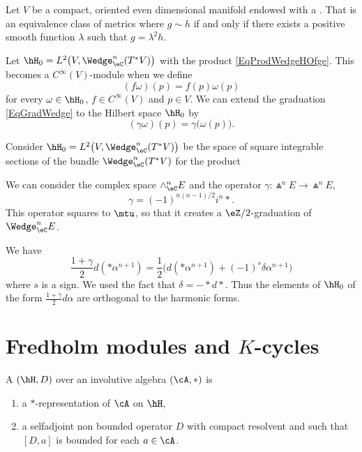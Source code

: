 Let $V$ be a compact, oriented even dimensional manifold endowed with a . That is an equivalence class of metrics where $g\sim h$ if and only if there exists a positive smooth function $\lambda$ such that $g=\lambda^2 h$.

Let $\hH_0=L^2\big( V,\Wedge^n_{\eC}(T^*V) \big)$ with the product \eqref{EqProdWedgeHOfge}. This becomes a $ C^{\infty}(V)$-module when we define
\begin{equation}
	(f\omega)(p)=f(p)\omega(p)
\end{equation}
for every $\omega\in\hH_0$, $f\in C^{\infty}(V)$ and $p\in V$. We can extend the graduation \eqref{EqGradWedge} to the Hilbert space $\hH_0$ by
\begin{equation}
	(\gamma\omega)(p)=\gamma\big( \omega(p) \big).
\end{equation}


Consider $\hH_0=L^2\big( V,\Wedge^n_{\eC}(T^*V) \big)$ be the space of square integrable sections of the bundle $\Wedge^n_{\eC}(T^*V)$ for the product

We can consider the complex space $\wedge^n_{\eC}E$ and the operator $\gamma\colon \Wedge^nE\to \Wedge^nE$,
\begin{equation}
	\gamma=(-1)^{n(n-1)/2}i^n *.
\end{equation}
This operator squares to $\mtu$, so that it creates a $\eZ/2$-graduation of $\Wedge^n_{\eC}E$.

We have 
\begin{equation}
	\frac{ 1+\gamma }{2}d(*\alpha^{n+1})=\frac{ 1 }{2}\Big( d(*\alpha^{n+1})+(-1)^s\delta\alpha^{n+1} \Big)
\end{equation}
where $s$ is a sign. We used the fact that $\delta=-*d*$. Thus the elements of $\hH_0$ of the form $\frac{ 1+\gamma }{2}d\alpha$ are orthogonal to the harmonic forms.


\section{Fredholm modules and $K$-cycles}

\begin{definition}
	A  $(\hH,D)$ over an involutive algebra $(\cA,*)$ is 
	\begin{enumerate}
		\item a $*$-representation of $\cA$ on $\hH$,
		\item a selfadjoint non bounded operator $D$ with compact resolvent and such that $[D,a]$ is bounded for each $a\in\cA$.
	\end{enumerate}
\end{definition}

